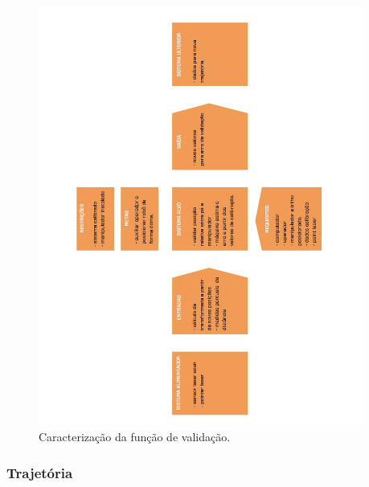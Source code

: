 \documentclass[12pt,a4paper]{article}
\begin{document}
\begin{figure}[H]
\begin{center}
  \includegraphics[width=0.95\textwidth]{figs/caracterizacao_validacao.jpg}
  \caption{Caracterização da função de validação.}
  \label{fig:caracterização validação}
\end{center}
\end{figure} 

\subsubsection {Trajetória}
\end{document}

